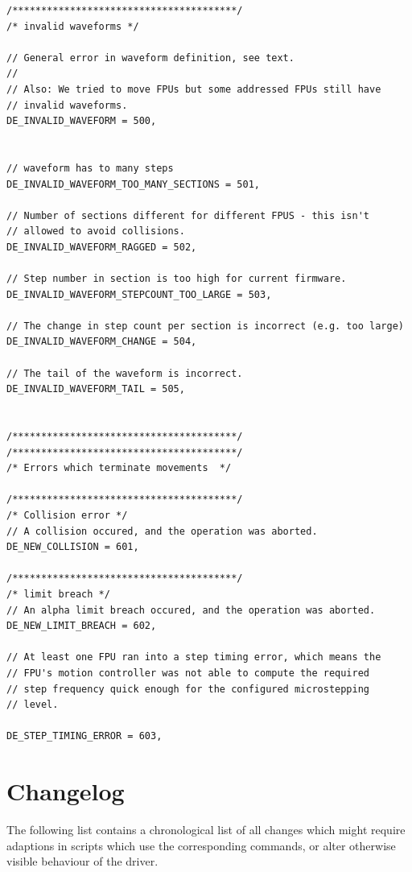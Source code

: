 \documentclass[11pt,a4paper]{scrartcl}
\begin{document}
\begin{verbatim}
/***************************************/
/* invalid waveforms */

// General error in waveform definition, see text.
//
// Also: We tried to move FPUs but some addressed FPUs still have
// invalid waveforms.
DE_INVALID_WAVEFORM = 500,


// waveform has to many steps
DE_INVALID_WAVEFORM_TOO_MANY_SECTIONS = 501,

// Number of sections different for different FPUS - this isn't
// allowed to avoid collisions.
DE_INVALID_WAVEFORM_RAGGED = 502,

// Step number in section is too high for current firmware.
DE_INVALID_WAVEFORM_STEPCOUNT_TOO_LARGE = 503,

// The change in step count per section is incorrect (e.g. too large)
DE_INVALID_WAVEFORM_CHANGE = 504,

// The tail of the waveform is incorrect.
DE_INVALID_WAVEFORM_TAIL = 505,


/***************************************/
/***************************************/
/* Errors which terminate movements  */

/***************************************/
/* Collision error */
// A collision occured, and the operation was aborted.
DE_NEW_COLLISION = 601,

/***************************************/
/* limit breach */
// An alpha limit breach occured, and the operation was aborted.
DE_NEW_LIMIT_BREACH = 602,

// At least one FPU ran into a step timing error, which means the
// FPU's motion controller was not able to compute the required
// step frequency quick enough for the configured microstepping
// level.

DE_STEP_TIMING_ERROR = 603,
\end{verbatim}

\section{Changelog}

The following list contains a chronological list of all changes which
might require adaptions in scripts which use the corresponding
commands, or alter otherwise visible behaviour of the driver.
\end{document}
